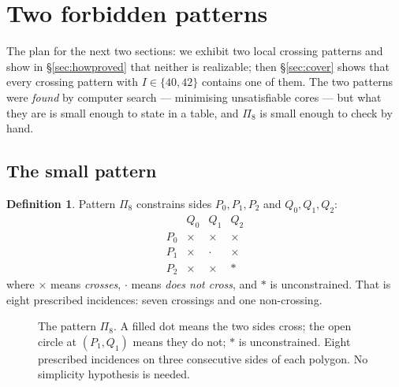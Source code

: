 \documentclass[11pt,a4paper]{article}
\theoremstyle{plain}
\theoremstyle{definition}
\newtheorem{definition}[theorem]{Definition}
\theoremstyle{remark}
\begin{document}
\section{Two forbidden patterns}\label{sec:patterns}

The plan for the next two sections: we exhibit two local crossing patterns and
show in \S\ref{sec:howproved} that neither is realizable; then \S\ref{sec:cover}
shows that every crossing pattern with $I\in\{40,42\}$ contains one of them. The
two patterns were \emph{found} by computer search --- minimising unsatisfiable
cores --- but what they are is small enough to state in a table, and $\Pi_8$ is
small enough to check by hand.

\subsection{The small pattern}

\begin{definition}\label{def:pat8}
Pattern $\Pi_8$ constrains sides $P_0,P_1,P_2$ and $Q_0,Q_1,Q_2$:
\[
\begin{array}{c|ccc}
      & Q_0 & Q_1 & Q_2 \\ \hline
  P_0 & \times & \times & \times \\
  P_1 & \times & \cdot   & \times \\
  P_2 & \times & \times & \ast
\end{array}
\]
where $\times$ means \emph{crosses}, $\cdot$ means \emph{does not cross}, and
$\ast$ is unconstrained. That is eight prescribed incidences: seven crossings
and one non-crossing.
\end{definition}

\begin{figure}[ht]
\centering
{}
\caption{The pattern $\Pi_8$. A filled dot means the two sides cross; the open
circle at $(P_1,Q_1)$ means they do not; $\ast$ is unconstrained. Eight
prescribed incidences on three consecutive sides of each polygon. No simplicity
hypothesis is needed.}\label{fig:pat8}
\end{figure}
\end{document}

